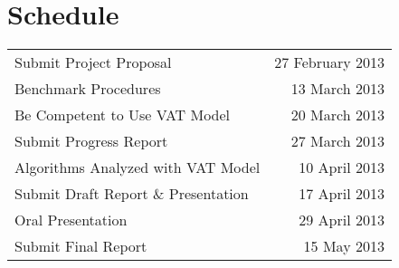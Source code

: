\section{Schedule}
  \begin{tabular}{lr}
    Submit Project Proposal             & 27 February 2013\\
    Benchmark Procedures                & 13 March 2013   \\
    Be Competent to Use VAT Model       & 20 March 2013   \\
    Submit Progress Report              & 27 March 2013   \\
    Algorithms Analyzed with VAT Model  & 10 April 2013 \\
    Submit Draft Report \& Presentation & 17 April 2013   \\
    Oral Presentation                   & 29 April 2013   \\
    Submit Final Report                 & 15 May 2013     \\
  \end{tabular}
  